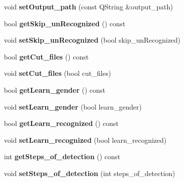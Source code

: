 \begin{DoxyCompactItemize}
\mbox{\label{classSettings_aadff2d91d4479ccf743f3ae7510e2d20}} 
void {\bfseries set\+Output\+\_\+path} (const Q\+String \&output\+\_\+path)
\item 
\mbox{\label{classSettings_a257b268ea7c9c498fb9d3235d01fac19}} 
bool {\bfseries get\+Skip\+\_\+un\+Recognized} () const
\item 
\mbox{\label{classSettings_a47af75ae812e9448e610ae3abef22fab}} 
void {\bfseries set\+Skip\+\_\+un\+Recognized} (bool skip\+\_\+un\+Recognized)
\item 
\mbox{\label{classSettings_a0c8d329d5c4894e5dd4aa5e2895e2c0e}} 
bool {\bfseries get\+Cut\+\_\+files} () const
\item 
\mbox{\label{classSettings_af52bdf032abc5834eafdeee3c90bc4b1}} 
void {\bfseries set\+Cut\+\_\+files} (bool cut\+\_\+files)
\item 
\mbox{\label{classSettings_a68e897fadeec6ca161e1ddd8474fd526}} 
bool {\bfseries get\+Learn\+\_\+gender} () const
\item 
\mbox{\label{classSettings_a5a7c4c75111a27069494338c37fc67ae}} 
void {\bfseries set\+Learn\+\_\+gender} (bool learn\+\_\+gender)
\item 
\mbox{\label{classSettings_ac486fc156195d8ce64cd456d5b5d7bfb}} 
bool {\bfseries get\+Learn\+\_\+recognized} () const
\item 
\mbox{\label{classSettings_a79ae5d1bb99b8895574652f185348ffd}} 
void {\bfseries set\+Learn\+\_\+recognized} (bool learn\+\_\+recognized)
\item 
\mbox{\label{classSettings_ae66c185fa4b028a2ead36d2a7c31fdcb}} 
int {\bfseries get\+Steps\+\_\+of\+\_\+detection} () const
\item 
\mbox{\label{classSettings_a79a94f2ae969e79a788283d1c3c3139d}} 
void {\bfseries set\+Steps\+\_\+of\+\_\+detection} (int steps\+\_\+of\+\_\+detection)
\item 
\mbox{\label{classSettings_aa7ed74188185598a4cebc82f56e9789f}} 

\end{DoxyCompactItemize}
